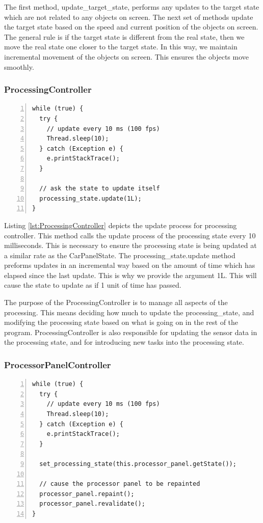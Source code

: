 \documentclass{article} %
\begin{document}
The first method, update\_target\_state, performs any updates to the target state which are not related to any objects on screen.
The next set of methods update the target state based on the speed and current position of the objects on screen.
The general rule is if the target state is different from the real state, then we move the real state one closer to the target state.
In this way, we maintain incremental movement of the objects on screen.
This ensures the objects move smoothly.

\subsubsection{ProcessingController}
\begin{lstlisting}[caption={Processing Controller Update Procedure},label={lst:ProcessingController},numbers=left]
while (true) {
  try {
    // update every 10 ms (100 fps)
    Thread.sleep(10);
  } catch (Exception e) {
    e.printStackTrace();
  }

  // ask the state to update itself
  processing_state.update(1L);
}
\end{lstlisting}

Listing \ref{lst:ProcessingController} depicts the update process for processing controller. This method calls the update process of the processing state every 10 milliseconds. This is necessary to ensure the processing state is being updated at a similar rate as the CarPanelState.
The processing\_state.update method preforms updates in an incremental way based on the amount of time which has elapsed since the last update. This is why we provide the argument 1L. This will cause the state to update as if 1 unit of time has passed.

The purpose of the ProcessingController is to manage all aspects of the processing. This means deciding how much to update the processing\_state, and modifying the processing state based on what is going on in the rest of the program. ProcessingController is also responsible for updating the sensor data in the processing state, and for introducing new tasks into the processing state.

\subsubsection{ProcessorPanelController}
\begin{lstlisting}[caption={Processing Panel Update Procedure},label={lst:ProcessingPanelController},numbers=left]
while (true) {
  try {
    // update every 10 ms (100 fps)
    Thread.sleep(10);
  } catch (Exception e) {
    e.printStackTrace();
  }

  set_processing_state(this.processor_panel.getState());
  
  // cause the processor panel to be repainted
  processor_panel.repaint();
  processor_panel.revalidate();
}
\end{lstlisting}
\end{document}
